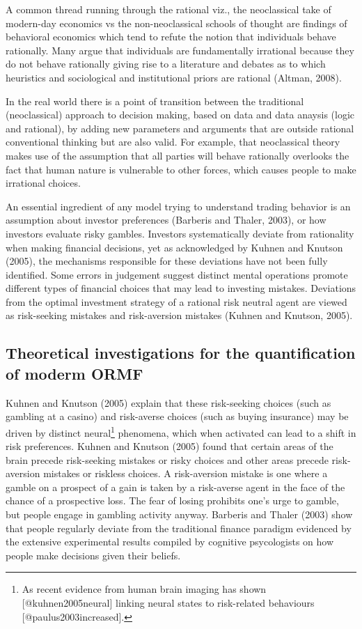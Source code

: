 \documentclass[]{DissertateUSU}
\let\rmarkdownfootnote\footnote%
\def\footnote{\protect\rmarkdownfootnote}
\begin{document}
A common thread running through the rational viz., the neoclassical take
of modern-day economics vs the non-neoclassical schools of thought are
findings of behavioral economics which tend to refute the notion that
individuals behave rationally. Many argue that individuals are
fundamentally irrational because they do not behave rationally giving
rise to a literature and debates as to which heuristics and sociological
and institutional priors are rational (Altman, 2008).\medskip

In the real world there is a point of transition between the traditional
(neoclassical) approach to decision making, based on data and data
anaysis (logic and rational), by adding new parameters and arguments
that are outside rational conventional thinking but are also valid. For
example, that neoclassical theory makes use of the assumption that all
parties will behave rationally overlooks the fact that human nature is
vulnerable to other forces, which causes people to make irrational
choices.\medskip 

An essential ingredient of any model trying to understand trading
behavior is an assumption about investor preferences (Barberis and
Thaler, 2003), or how investors evaluate risky gambles. Investors
systematically deviate from rationality when making financial decisions,
yet as acknowledged by Kuhnen and Knutson (2005), the mechanisms
responsible for these deviations have not been fully identified. Some
errors in judgement suggest distinct mental operations promote different
types of financial choices that may lead to investing mistakes.
Deviations from the optimal investment strategy of a rational risk
neutral agent are viewed as risk-seeking mistakes and risk-aversion
mistakes (Kuhnen and Knutson, 2005).\medskip 

\subsection{Theoretical investigations for the quantification of moderm ORMF}

Kuhnen and Knutson (2005) explain that these risk-seeking choices (such
as gambling at a casino) and risk-averse choices (such as buying
insurance) may be driven by distinct
neural\footnote{As recent evidence from human brain imaging has shown [@kuhnen2005neural] linking neural states to risk-related behaviours [@paulus2003increased].}
phenomena, which when activated can lead to a shift in risk preferences.
Kuhnen and Knutson (2005) found that certain areas of the brain precede
risk-seeking mistakes or risky choices and other areas precede
risk-aversion mistakes or riskless choices. A risk-aversion mistake is
one where a gamble on a prospect of a gain is taken by a risk-averse
agent in the face of the chance of a prospective loss. The fear of
losing prohibits one's urge to gamble, but people engage in gambling
activity anyway. Barberis and Thaler (2003) show that people regularly
deviate from the traditional finance paradigm evidenced by the extensive
experimental results compiled by cognitive psycologists on how people
make decisions given their beliefs.\medskip 
\end{document}
